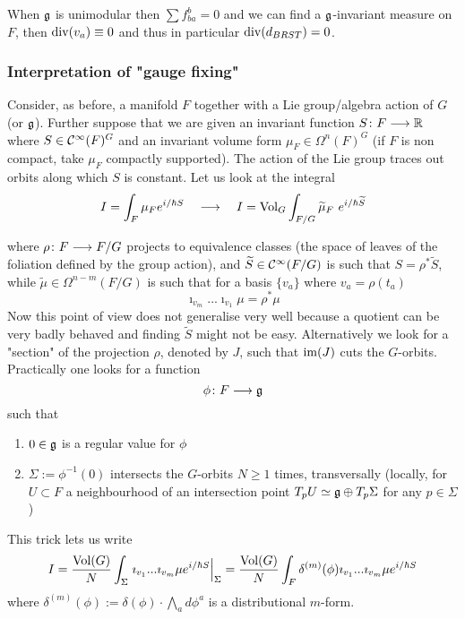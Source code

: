 When $\mathfrak{g}$ is unimodular then $\sum f^b_{ba} = 0$ and we can find a $\mathfrak{g}$-invariant measure on $F$, then $\operatorname{div}(v_a) \equiv 0$ and thus in particular $\operatorname{div}(d_{BRST}) = 0$.

\subsubsection{Interpretation of "gauge fixing"}
Consider, as before, a manifold $F$ together with a Lie group/algebra action of $G$ (or $\mathfrak{g}$). Further suppose that we are given an invariant function $S \colon F \longrightarrow \mathbb{R}$ where $S \in \mathcal{C}^{\infty}(F)^G$ and an invariant volume form $\mu_F \in \Omega^n(F)^G$ (if $F$ is non compact, take $\mu_F$ compactly supported). The action of the Lie group traces out orbits along which $S$ is constant. Let us look at the integral
\begin{equation}
  I = \int_{F} \mu_F e^{i/\hbar S} \quad \longrightarrow \quad  I = \operatorname{Vol}_G \int_{F / G} \widetilde{\mu}_F \ e^{i/\hbar \widetilde{S}}
\end{equation}

where $\rho \colon F \longrightarrow F/G$ projects to equivalence classes (the space of leaves of the foliation defined by the group action), and $\widetilde{S} \in \mathcal{C}^{\infty}(F/G)$ is such that $S = \rho^* \widetilde{S}$, while $\widetilde{\mu} \in \Omega^{n-m}(F/G)$ is such that for a basis $\{v_a\}$ where $v_a = \rho(t_a)$
\begin{equation}
  \imath_{v_m} ... \imath_{v_1} \mu = \rho^* \mu
\end{equation}
Now this point of view does not generalise very well because a quotient can be very badly behaved and finding $\widetilde{S}$ might not be easy. Alternatively we look for a "section" of the projection $\rho$, denoted by $J$, such that $\operatorname{im}(J)$ cuts the $G$-orbits. Practically one looks for a function
\begin{equation}
  \phi \colon F \lra \gf
\end{equation}
such that
\begin{enumerate}
  \item $0 \in \mathfrak{g}$ is a regular value for $\phi$
  \item $\Sigma := \phi^{-1}(0)$ intersects the $G$-orbits $N \geq 1$ times, transversally (locally, for $U \subset F$ a neighbourhood of an intersection point $T_p U \simeq \mathfrak{g} \oplus T_p \Sigma$ for any $p \in \Sigma$)
\end{enumerate}

\begin{sketch}
  This trick lets us write
  \begin{align}
    I = \frac{\vol(G)}{N} \int_\Sigma \left. \imath_{v_1} ... \imath_{v_m} \mu e^{i/\hbar S} \right|_\Sigma = \frac{\vol(G)}{N} \int_F \delta^{(m)}(\phi) \imath_{v_1} ... \imath_{v_m} \mu e^{i/\hbar S}
  \end{align}
  where $\delta^{(m)}(\phi) := \delta(\phi) \cdot \bigwedge_a d\phi^a$ is a distributional $m$-form.
\end{sketch}

